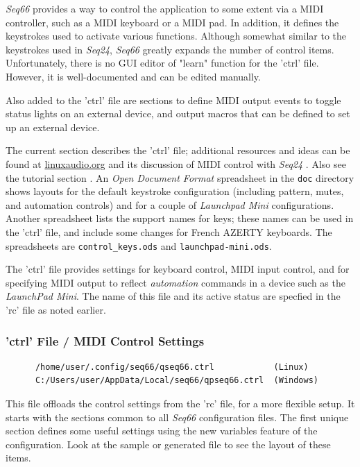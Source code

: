    \textsl{Seq66} provides a way to control the
   application to some extent via a MIDI controller, such as a MIDI keyboard or
   a MIDI pad.
   In addition, it defines the keystrokes used to activate various functions.
   Although somewhat similar to the keystrokes used in \textsl{Seq24},
   \textsl{Seq66} greatly expands the number of control items.
   Unfortunately, there is no GUI editor of "learn" function for the
   'ctrl' file.
   However, it is well-documented and can be edited manually.

   Also added to the 'ctrl' file are sections to define MIDI output events to
   toggle status lights on an external device, and
   output macros that can be defined to set up an external device.

   The current section describes the 'ctrl' file;
   additional resources and ideas can be found at \url{linuxaudio.org} and
   its discussion of MIDI control with \textsl{Seq24} \cite{midicontrol}.
   Also see the tutorial section .
   An \textsl{Open Document Format} spreadsheet in the
   \texttt{doc} directory shows layouts for the default
   keystroke configuration (including pattern, mutes, and automation controls)
   and for a couple of \textsl{Launchpad Mini} configurations.
   Another spreadsheet lists the support names for keys; these names can be used
   in the 'ctrl' file, and include some changes for French AZERTY keyboards.
   The spreadsheets are
   \texttt{control\_keys.ods} and
   \texttt{launchpad-mini.ods}.

   The 'ctrl' file provides settings for keyboard control, MIDI input
   control, and
   for specifying MIDI output to reflect \textsl{automation} commands in a
   device such as the \textsl{LaunchPad Mini}.  The name of this file and its
   active status are specfied in the 'rc' file as noted earlier.

\subsubsection{'ctrl' File / MIDI Control Settings}
\label{subsubsec:configuration_ctrl_midi_control_settings}

   \begin{verbatim}
      /home/user/.config/seq66/qseq66.ctrl            (Linux)
      C:/Users/user/AppData/Local/seq66/qpseq66.ctrl  (Windows)
   \end{verbatim}

   This file offloads the control settings from the 'rc' file, for a more
   flexible setup. It starts with the sections common to all \textsl{Seq66}
   configuration files.  The first unique section defines some useful settings
   using the new variables feature of the configuration.  Look at the sample or
   generated file to see the layout of these items.

